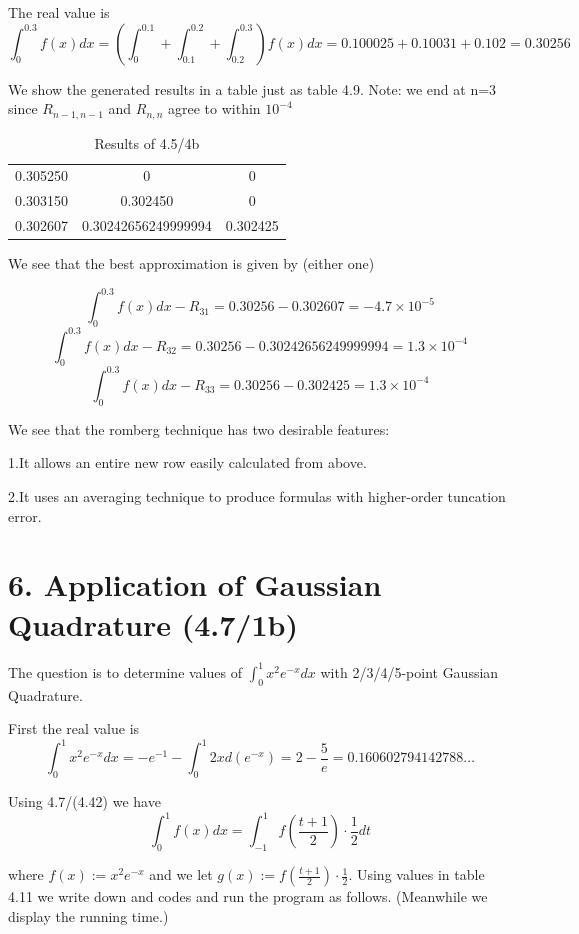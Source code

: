 \documentclass{article}
\begin{document}
    The real value is 
    $$\int_{0}^{0.3}f(x)dx=(\int_{0}^{0.1}+\int_{0.1}^{0.2}+\int_{0.2}^{0.3})f(x)dx=0.100025+0.10031+0.102=0.30256
    $$

    We show the generated results in a table just as table 4.9. Note: we end at n=3 since $R_{n-1,n-1}$ and $R_{n,n}$ agree to within $10^{-4}$

    \begin{table}[htbp]
    \centering
    \caption{Results of 4.5/4b}
    \begin{tabular}{ccc}
    \toprule
    0.305250 & 0 & 0 \\
    0.303150 & 0.302450 & 0 \\
    0.302607 & 0.30242656249999994 & 0.302425 \\ 
    \bottomrule
    \end{tabular}
    \end{table}

    We see that the best approximation is given by (either one)

    $$\int_{0}^{0.3}f(x)dx-R_{31}=0.30256-0.302607=-4.7\times 10^{-5}
    $$
    $$\int_{0}^{0.3}f(x)dx-R_{32}=0.30256-0.30242656249999994=1.3\times 10^{-4}
    $$
    $$\int_{0}^{0.3}f(x)dx-R_{33}=0.30256-0.302425=1.3\times 10^{-4}
    $$

    We see that the romberg technique has two desirable features:

    1.It allows an entire new row easily calculated from above.

    2.It uses an averaging technique to produce formulas with higher-order tuncation error.

\newpage
\section{6. Application of Gaussian Quadrature (4.7/1b)}
    The question is to determine values of $\int_{0}^{1}x^2e^{-x}dx$ with 2/3/4/5-point Gaussian Quadrature. 

    First the real value is 
    $$\int_{0}^{1}x^2e^{-x}dx=-e^{-1}-\int_{0}^{1}2xd(e^{-x})=2-\frac{5}{e}=0.160602794142788\ldots
    $$

    Using 4.7/(4.42) we have
    $$ \int_{0}^{1}f(x)dx=\int_{-1}^{1}f(\frac{t+1}{2})\cdot\frac{1}{2}dt
    $$

    where $f(x):=x^2e^{-x}$ and we let $g(x):=f(\frac{t+1}{2})\cdot\frac{1}{2}$. Using values in table 4.11 we write down and codes and run the program as follows. (Meanwhile we display the running time.)
\end{document}
